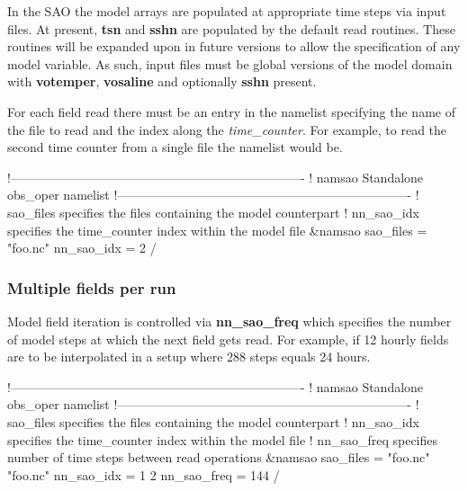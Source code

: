\documentclass[../main/NEMO_manual]{subfiles}
\begin{document}
In the SAO the model arrays are populated at appropriate time steps via input files.
At present, \textbf{tsn} and \textbf{sshn} are populated by the default read routines.
These routines will be expanded upon in future versions to allow the specification of any model variable.
As such, input files must be global versions of the model domain with
\textbf{votemper}, \textbf{vosaline} and optionally \textbf{sshn} present.

For each field read there must be an entry in the  namelist specifying
the name of the file to read and the index along the \emph{time\_counter}.
For example, to read the second time counter from a single file the namelist would be.

\begin{listing}
  \begin{forlines}
!----------------------------------------------------------------------
!       namsao Standalone obs_oper namelist
!----------------------------------------------------------------------
!   sao_files    specifies the files containing the model counterpart
!   nn_sao_idx   specifies the time_counter index within the model file
&namsao
   sao_files = "foo.nc"
   nn_sao_idx = 2
/
  \end{forlines}
  \caption{}
  \label{lst:namsao}
\end{listing}

\subsubsection{Multiple fields per run}

Model field iteration is controlled via \textbf{nn\_sao\_freq} which
specifies the number of model steps at which the next field gets read.
For example, if 12 hourly fields are to be interpolated in a setup where 288 steps equals 24 hours.

\begin{forlines}
!----------------------------------------------------------------------
!       namsao Standalone obs_oper namelist
!----------------------------------------------------------------------
!   sao_files    specifies the files containing the model counterpart
!   nn_sao_idx   specifies the time_counter index within the model file
!   nn_sao_freq  specifies number of time steps between read operations
&namsao
   sao_files = "foo.nc" "foo.nc"
   nn_sao_idx = 1 2
   nn_sao_freq = 144
/
\end{forlines}
\end{document}
